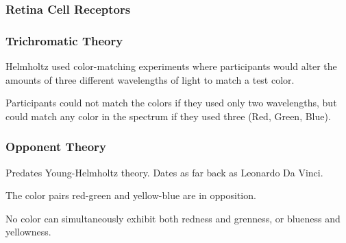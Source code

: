 \documentclass[12pt]{beamer}\usepackage[]{graphicx}\usepackage[]{color}
\begin{document}

\begin{frame}
\frametitle{Retina Cell Receptors}
\begin{center}
\end{center}
\end{frame}


\begin{frame}
\frametitle{Trichromatic Theory}

Helmholtz used color-matching experiments where participants would alter the 
amounts of three different wavelengths of light to match a test color.

\vspace{1cm}

Participants could not match the colors if they used only two wavelengths, 
but could match any color in the spectrum if they used three (Red, Green, Blue).
\eb

\end{frame}


\begin{frame}
\begin{center}
\Huge{}
\end{center}
\end{frame}


\begin{frame}
\frametitle{Opponent Theory}

\bbi
  \item Predates Young-Helmholtz theory. Dates as far back as Leonardo Da Vinci.
  \item The color pairs red-green and yellow-blue are in opposition.
  \item No color can simultaneously exhibit both redness and grenness, 
  or blueness and yellowness.
\ei
\eb

\end{frame}

\end{document}
